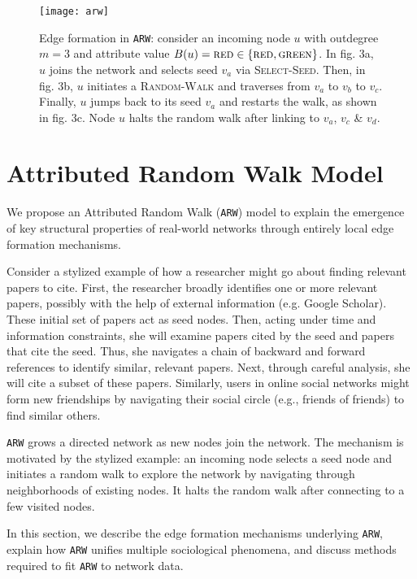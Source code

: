 
\begin{figure*}
	\vspace{-15pt}
    \centering
    \texttt{[image: arw]}
    \caption{Edge formation in \texttt{ARW}: consider
    an incoming node $u$ with outdegree ${m=3}$ and attribute value {$B(u)=\textsc{red} \in \{\textsc{red},\textsc{green}\}$}.
    In fig. 3a, $u$ joins the network and selects seed $v_a$ via \textsc{Select-Seed}.
    Then, in fig. 3b, $u$ initiates a \textsc{Random-Walk} and traverses from $v_a$ to $v_b$ to $v_c$.
    Finally, $u$ jumps back to its seed $v_a$ and restarts the walk, as shown in fig. 3c.
    Node $u$ halts the random walk after linking to $v_a$, $v_c$ \& $v_d$.
    }
    \label{fig:randomwalk}
	\vspace{-8pt}
\end{figure*}

\section{Attributed Random Walk Model}
\label{sec:Proposed Model}
We propose an Attributed Random Walk (\texttt{ARW}) model to explain the emergence
of key structural properties of real-world networks through {entirely local}
edge formation mechanisms.

Consider a stylized example of how a researcher might go about finding relevant
papers to cite. First, the researcher broadly identifies one or more {relevant}
papers, possibly with the help of external information (e.g. Google
Scholar). These initial set of papers act as seed nodes.  Then, acting under
time and information constraints, she will examine papers cited by the seed and
papers that cite the seed. Thus, she navigates a chain of
backward and forward references to identify {similar}, relevant papers.
Next, through careful analysis, she will cite a subset of these papers. Similarly, users in
online social networks might form new friendships by navigating their social
circle (e.g., friends of friends) to find similar others.

\texttt{ARW} grows a directed network as new nodes join the network. The
mechanism is motivated by the stylized example: an incoming node selects a seed
node and initiates a random walk to explore the network by navigating through
neighborhoods of existing nodes. It halts the random walk after connecting to a
few visited nodes.

In this section, we describe the edge formation mechanisms underlying
\texttt{ARW}, explain how \texttt{ARW} unifies multiple sociological phenomena,
and discuss methods required to fit \texttt{ARW} to network data.


